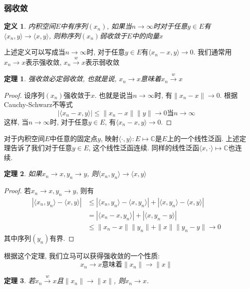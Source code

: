 \documentclass{book}
\newtheorem{definition}{\hspace{2em}定义}[section]
\newtheorem{theorem}{\hspace{2em}定理}[section]
\newtheorem{proof}{证明}[section]
\begin{document}
\subsubsection*{弱收敛}
\begin{definition}
  内积空间$E$中有序列$(x_n)$, 如果当$n\to \infty$时对于任意$y\in E$有$\langle x_n,y\rangle\to\langle x,y\rangle$, 则称序列$(x_n)$弱收敛于$E$中的向量$x$
\end{definition}
上述定义可以写成当$n\to\infty$时, 对于任意$y\in E$有$\langle x_n-x,y\rangle\to 0$. 我们通常用$x_n\to x$表示强收敛, $x_n\stackrel{w}{\to} x$表示弱收敛
\begin{theorem}
  强收敛必定弱收敛, 也就是说, $x_n\to x$意味着$x_n\stackrel{w}{\to}x$
\end{theorem}
\begin{proof}
  设序列$(x_n)$强收敛于$x$. 也就是说当$n\to \infty$时, 有$\|x_n-x\|\to 0$. 根据Cauchy-Schwarz不等式
  \begin{equation*}
    |\langle x_n-x,y\rangle|\leq\|x_n-x\|\|y\|\to 0\text{当$n\to\infty$}
  \end{equation*}
  这样, 当$n\to \infty$时, 对于任意$y\in E$, 有$\langle x_n-x,y\rangle\to 0$.
\end{proof}
对于内积空间$E$中任意的固定点$y$, 映射$\langle\cdot,y\rangle:E\mapsto\mathbb{C}$是$E$上的一个线性泛函. 上述定理告诉了我们对于任意$y\in E$, 这个线性泛函连续. 同样的线性泛函$\langle x,\cdot\rangle\mapsto\mathbb{C}$也连续.
\begin{theorem}
  如果$x_n\to x,y_n\to y$, 则$\langle x_n,y_n\rangle\to\langle x,y\rangle$
\end{theorem}
\begin{proof}
  若$x_n\to x,y_n\to y$, 则有
  \begin{equation*}
  \begin{split}
     |\langle x_n,y_n\rangle-\langle x,y\rangle|& \leq|\langle x_n,y_n\rangle-\langle x,y_n\rangle|+|\langle x,y_n\rangle-\langle x,y\rangle| \\
       & =|\langle x_n-x,y_n\rangle|+|\langle x,y_n-y\rangle| \\
       & \leq\|x_n-x\|\|y_n\|+\|x\|\|y_n-y\|\to 0
  \end{split}
  \end{equation*}
  其中序列$(y_n)$有界.
\end{proof}
根据这个定理, 我们立马可以获得强收敛的一个性质:
\begin{equation*}
  x_n\to x\text{意味着$\|x_n\|\to\|x\|$}
\end{equation*}
\begin{theorem}
  若$x_n\stackrel{w}{\to}x$且$\|x_n\|\to\|x\|$, 则$x_n\to x$.
\end{theorem}
\end{document}
